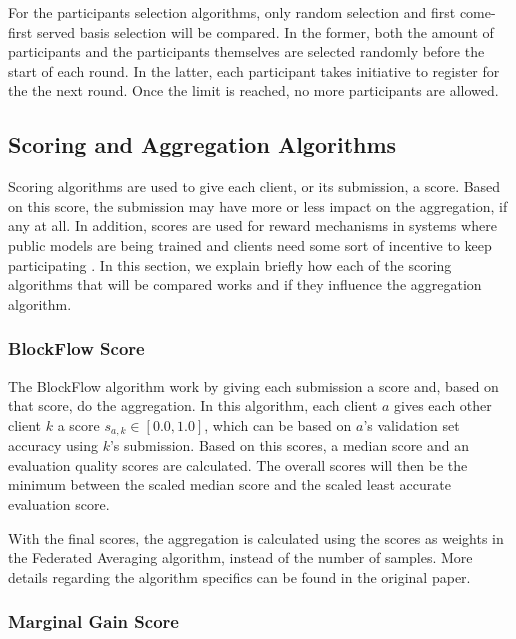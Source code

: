 For the participants selection algorithms, only random selection and first come-first served basis selection will be compared. In the former, both the amount of participants and the participants themselves are selected randomly before the start of each round. In the latter, each participant takes initiative to register for the the next round. Once the limit is reached, no more participants are allowed.

\subsection{Scoring and Aggregation Algorithms}
\label{background:scoring}

Scoring algorithms are used to give each client, or its submission, a score. Based on this score, the submission may have more or less impact on the aggregation, if any at all. In addition, scores are used for reward mechanisms in systems where public models are being trained and clients need some sort of incentive to keep participating \cite{8945913, 8832210, 8905038, 9006344}. In this section, we explain briefly how each of the scoring algorithms that will be compared works and if they influence the aggregation algorithm.

\subsubsection{BlockFlow Score}

The BlockFlow algorithm \cite{10.48550/arxiv.2007.03856} work by giving each submission a score and, based on that score, do the aggregation. In this algorithm, each client $a$ gives each other client $k$ a score $s_{a,k} \in [0.0, 1.0]$, which can be based on $a$'s validation set accuracy using $k$'s submission. Based on this scores, a median score and an evaluation quality scores are calculated. The overall scores will then be the minimum between the scaled median score and the scaled least accurate evaluation score.

With the final scores, the aggregation is calculated using the scores as weights in the Federated Averaging algorithm, instead of the number of samples. More details regarding the algorithm specifics can be found in the original paper.

\subsubsection{Marginal Gain Score}

